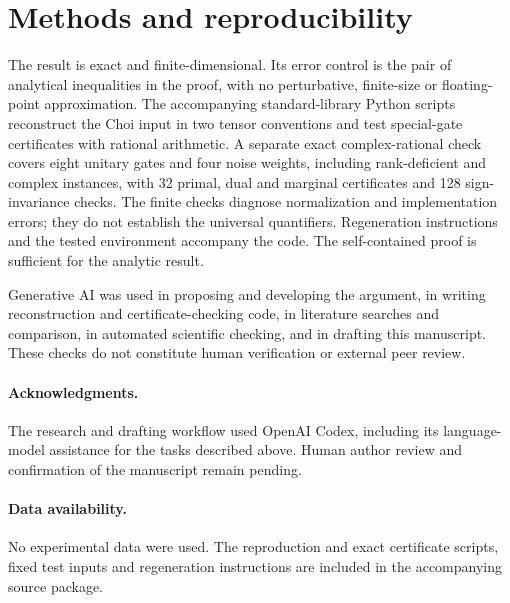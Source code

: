 \documentclass[11pt]{article}
\begin{document}
\section{Methods and reproducibility}
The result is exact and finite-dimensional. Its error control is
the pair of analytical inequalities in the proof, with no
perturbative, finite-size or floating-point approximation.
The accompanying standard-library Python scripts reconstruct
the Choi input in two tensor conventions and test special-gate
certificates with rational arithmetic. A separate exact
complex-rational check covers eight unitary gates and four noise
weights, including rank-deficient and complex instances, with
32 primal, dual and marginal certificates and 128 sign-invariance
checks. The finite checks diagnose normalization and implementation
errors; they do not establish the universal quantifiers.
Regeneration instructions and the tested environment accompany the
code. The self-contained proof is sufficient for the analytic result.

Generative AI was used in proposing and developing the argument,
in writing reconstruction and certificate-checking code, in
literature searches and comparison, in automated scientific
checking, and in drafting this manuscript. These checks do not
constitute human verification or external peer review.

\paragraph{Acknowledgments.}
The research and drafting workflow used OpenAI Codex, including
its language-model assistance for the tasks described above.
Human author review and confirmation of the manuscript remain pending.

\paragraph{Data availability.}
No experimental data were used. The reproduction and exact
certificate scripts, fixed test inputs and regeneration instructions
are included in the accompanying source package.



\end{document}
